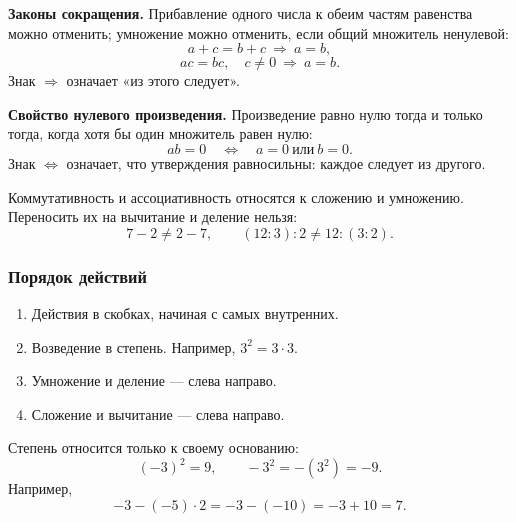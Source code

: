\documentclass[12pt,a4paper]{article}
\theoremstyle{definition}
\theoremstyle{plain}
\theoremstyle{remark}
\begin{document}
\textbf{Законы сокращения.}
Прибавление одного числа к обеим частям равенства можно отменить;
умножение можно отменить, если общий множитель ненулевой:
\[
a+c=b+c\ \Longrightarrow\ a=b,
\]
\[
ac=bc,\quad c\ne0\ \Longrightarrow\ a=b.
\]
Знак \(\Longrightarrow\) означает «из этого следует».

\textbf{Свойство нулевого произведения.}
Произведение равно нулю тогда и только тогда, когда хотя бы один множитель равен нулю:
\[
ab=0\quad\Longleftrightarrow\quad a=0\ \text{или}\ b=0.
\]
Знак \(\Longleftrightarrow\) означает, что утверждения равносильны: каждое следует из другого.

Коммутативность и ассоциативность относятся к сложению и умножению.
Переносить их на вычитание и деление нельзя:
\[
7-2\ne2-7,\qquad (12:3):2\ne12:(3:2).
\]

\subsubsection*{Порядок действий}

\begin{enumerate}[label=\arabic*.,leftmargin=2em,itemsep=3pt]
\item Действия в скобках, начиная с самых внутренних.
\item Возведение в степень. Например, \(3^2=3\cdot3\).
\item Умножение и деление --- слева направо.
\item Сложение и вычитание --- слева направо.
\end{enumerate}

Степень относится только к своему основанию:
\[
(-3)^2=9,\qquad -3^2=-(3^2)=-9.
\]
Например,
\[
-3-(-5)\cdot2=-3-(-10)=-3+10=7.
\]
\end{document}
